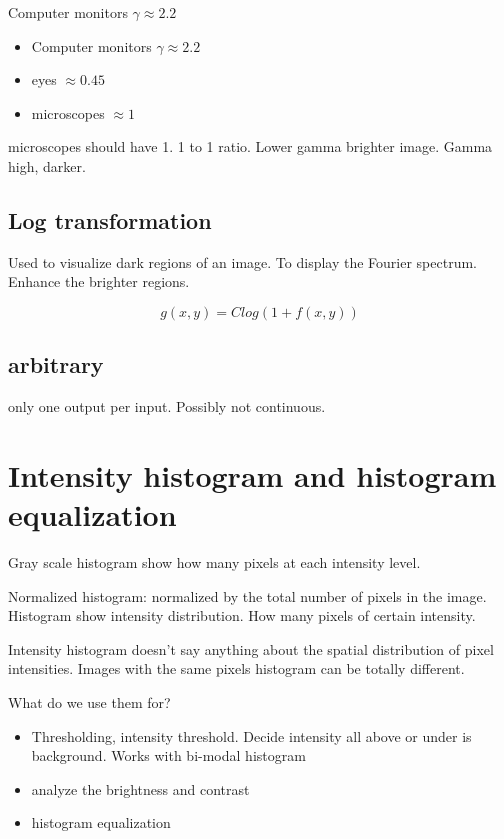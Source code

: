 Computer monitors $ \gamma \approx 2.2$

\begin{itemize}
    \item Computer monitors $ \gamma \approx 2.2$
    \item eyes $\approx 0.45$
    \item microscopes $\approx 1$
\end{itemize}

microscopes should have 1. 1 to 1 ratio. Lower gamma brighter image. Gamma high, darker. 

\subsection*{Log transformation}
Used to visualize dark regions of an image. To display the Fourier spectrum. Enhance the brighter regions. 

\begin{equation}
g(x,y) = Clog(1 + f(x,y))
\end{equation}

\subsection*{arbitrary}
only one output per input. Possibly not continuous.


\section{Intensity histogram and histogram equalization}

Gray scale histogram show how many pixels at each intensity level. 

Normalized histogram: normalized by the total number of pixels in the image. Histogram show intensity distribution. How many pixels of certain intensity.

Intensity histogram doesn't say anything about the spatial distribution of pixel intensities. Images with the same pixels histogram can  be totally different.

What do we use them for? 
\begin{itemize}
    \item Thresholding, intensity threshold. Decide intensity all above or under is background. Works with bi-modal histogram
    \item analyze the brightness and contrast
    \item histogram equalization
\end{itemize}

